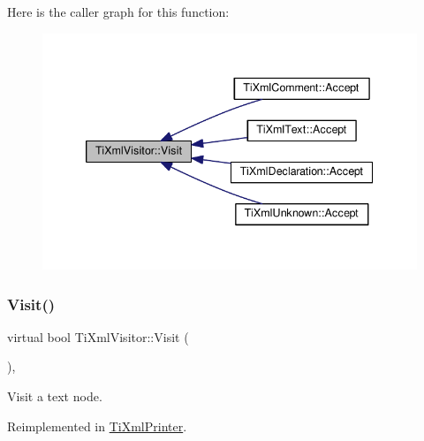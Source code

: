 Here is the caller graph for this function\+:
\nopagebreak
\begin{figure}[H]
\begin{center}
\leavevmode
\includegraphics[width=339pt]{class_ti_xml_visitor_afad71c71ce6473fb9b4b64cd92de4a19_icgraph}
\end{center}
\end{figure}
\mbox{\label{class_ti_xml_visitor_a399b8ebca5cd14664974a32d2ce029e5}} 
\subsubsection{\texorpdfstring{Visit()}{Visit()}\hspace{0.1cm}{\footnotesize\ttfamily [2/4]}}
{\footnotesize\ttfamily virtual bool Ti\+Xml\+Visitor\+::\+Visit (\begin{DoxyParamCaption}\item[{const \hyperlink{class_ti_xml_text}{Ti\+Xml\+Text} \&}]{ }\end{DoxyParamCaption})\hspace{0.3cm}{\ttfamily [inline]}, {\ttfamily [virtual]}}



Visit a text node. 



Reimplemented in \hyperlink{class_ti_xml_printer_a0857c5d32c59b9a257f9a49cb9411df5}{Ti\+Xml\+Printer}.

\mbox{\label{class_ti_xml_visitor_a53a60e7a528627b31af3161972cc7fa2}} 
